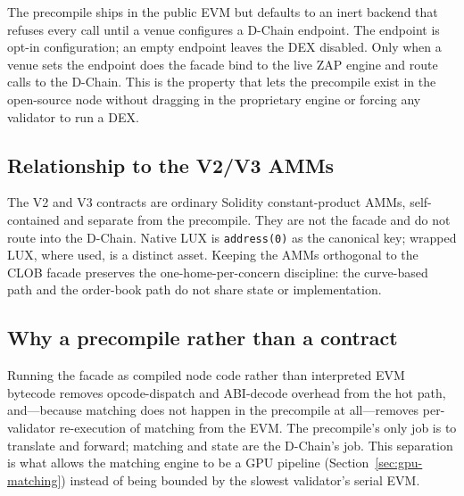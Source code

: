 The precompile ships in the public EVM but defaults to an inert backend that refuses every
call until a venue configures a D-Chain endpoint. The endpoint is opt-in configuration; an
empty endpoint leaves the DEX disabled. Only when a venue sets the endpoint does the facade
bind to the live ZAP engine and route calls to the D-Chain. This is the property that lets
the precompile exist in the open-source node without dragging in the proprietary engine or
forcing any validator to run a DEX.

\subsection{Relationship to the V2/V3 AMMs}

The V2 and V3 contracts are ordinary Solidity constant-product AMMs, self-contained and
separate from the precompile. They are not the facade and do not route into the D-Chain.
Native LUX is \texttt{address(0)} as the canonical key; wrapped LUX, where used, is a
distinct asset. Keeping the AMMs orthogonal to the CLOB facade preserves the
one-home-per-concern discipline: the curve-based path and the order-book path do not share
state or implementation.

\subsection{Why a precompile rather than a contract}

Running the facade as compiled node code rather than interpreted EVM bytecode removes
opcode-dispatch and ABI-decode overhead from the hot path, and---because matching does not
happen in the precompile at all---removes per-validator re-execution of matching from the
EVM. The precompile's only job is to translate and forward; matching and state are the
D-Chain's job. This separation is what allows the matching engine to be a GPU pipeline
(Section~\ref{sec:gpu-matching}) instead of being bounded by the slowest validator's serial
EVM.
